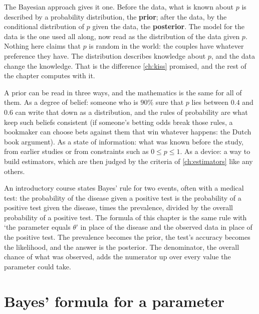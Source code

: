 The Bayesian approach gives it one.
Before the data, what is known about $p$ is described by a probability distribution, the \textbf{prior}; after the data, by the conditional distribution of $p$ given the data, the \textbf{posterior}.
The model for the data is the one used all along, now read as the distribution of the data given $p$.
Nothing here claims that $p$ is random in the world: the couples have whatever preference they have.
The distribution describes knowledge about $p$, and the data change the knowledge.
That is the difference \cref{ch:kiss} promised, and the rest of the chapter computes with it.

A prior can be read in three ways, and the mathematics is the same for all of them.
As a degree of belief: someone who is $90\%$ sure that $p$ lies between $0.4$ and $0.6$ can write that down as a distribution, and the rules of probability are what keep such beliefs consistent (if someone's betting odds break those rules, a bookmaker can choose bets against them that win whatever happens: the Dutch book argument).
As a state of information: what was known before the study, from earlier studies or from constraints such as $0 \leq p \leq 1$.
As a device: a way to build estimators, which are then judged by the criteria of \cref{ch:estimators} like any others.

\begin{bridge}
An introductory course states Bayes' rule for two events, often with a medical test: the probability of the disease given a positive test is the probability of a positive test given the disease, times the prevalence, divided by the overall probability of a positive test.
The formula of this chapter is the same rule with `the parameter equals $\theta$' in place of the disease and the observed data in place of the positive test.
The prevalence becomes the prior, the test's accuracy becomes the likelihood, and the answer is the posterior.
The denominator, the overall chance of what was observed, adds the numerator up over every value the parameter could take.
\end{bridge}

\section{Bayes' formula for a parameter}
\label{sec:bayes-formula}


